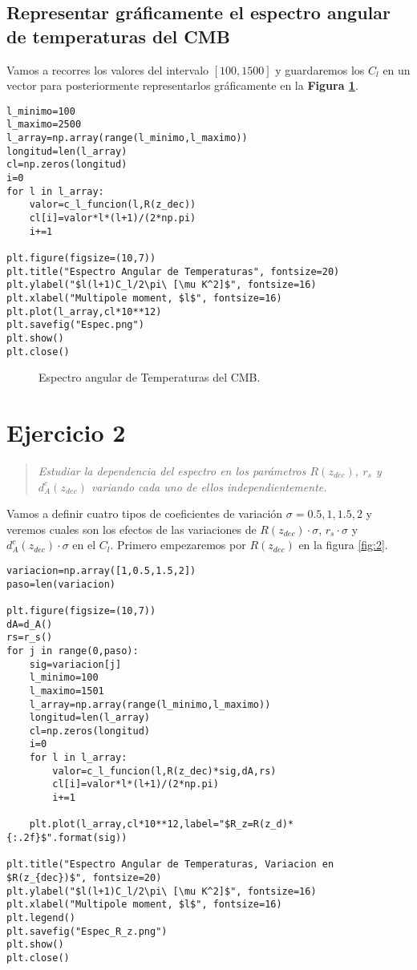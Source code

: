 \documentclass{article}
\begin{document}
\subsection{Representar gráficamente el espectro angular de temperaturas del CMB}
Vamos a recorres los valores del intervalo $[100,1500]$ y guardaremos los $C_l$ en un vector para posteriormente representarlos gráficamente en la \textbf{Figura \ref{fig:1}}.
\begin{lstlisting}[style=Python]
l_minimo=100
l_maximo=2500
l_array=np.array(range(l_minimo,l_maximo))
longitud=len(l_array)
cl=np.zeros(longitud)
i=0    
for l in l_array:
    valor=c_l_funcion(l,R(z_dec))
    cl[i]=valor*l*(l+1)/(2*np.pi)
    i+=1

plt.figure(figsize=(10,7))
plt.title("Espectro Angular de Temperaturas", fontsize=20)
plt.ylabel("$l(l+1)C_l/2\pi\ [\mu K^2]$", fontsize=16)
plt.xlabel("Multipole moment, $l$", fontsize=16)
plt.plot(l_array,cl*10**12)
plt.savefig("Espec.png")
plt.show()     
plt.close()
\end{lstlisting}

\begin{figure}[h]
    \begin{center}
    \end{center}
    \caption{\label{fig:1} Espectro angular de Temperaturas del CMB.}
\end{figure}

\section{Ejercicio 2}
\begin{quote}
\textit{Estudiar la dependencia del espectro en los parámetros  $R(z_{dec})$, $r_s$ y $d_A^c(z_{dec})$ variando cada uno de ellos independientemente.}
\end{quote}

Vamos a definir cuatro tipos de coeficientes de variación $\sigma=0.5,1,1.5,2$ y veremos cuales son los efectos de las variaciones de  $R(z_{dec})\cdot\sigma$, $r_s\cdot\sigma$ y $d_A^c(z_{dec})\cdot\sigma$ en el $C_l$. Primero empezaremos por $R(z_{dec})$ en la figura \ref{fig:2}.
\begin{lstlisting}[style=Python]
variacion=np.array([1,0.5,1.5,2])
paso=len(variacion)

plt.figure(figsize=(10,7))
dA=d_A()
rs=r_s()
for j in range(0,paso):
    sig=variacion[j]
    l_minimo=100
    l_maximo=1501
    l_array=np.array(range(l_minimo,l_maximo))
    longitud=len(l_array)
    cl=np.zeros(longitud)
    i=0    
    for l in l_array:
        valor=c_l_funcion(l,R(z_dec)*sig,dA,rs)
        cl[i]=valor*l*(l+1)/(2*np.pi)
        i+=1
    
    plt.plot(l_array,cl*10**12,label="$R_z=R(z_d)*{:.2f}$".format(sig))

plt.title("Espectro Angular de Temperaturas, Variacion en $R(z_{dec})$", fontsize=20)
plt.ylabel("$l(l+1)C_l/2\pi\ [\mu K^2]$", fontsize=16)
plt.xlabel("Multipole moment, $l$", fontsize=16)
plt.legend()
plt.savefig("Espec_R_z.png")
plt.show()
plt.close()
\end{lstlisting}
\end{document}
